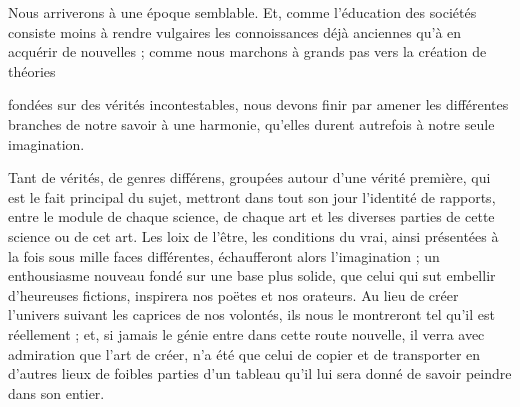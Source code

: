 \documentclass[11pt,a4paper]{article}
\begin{document}
Nous arriverons à une époque semblable. Et, comme l'éducation des sociétés
consiste moins à rendre vulgaires les connoissances déjà anciennes qu'à en
acquérir de nouvelles ; comme nous marchons à grands pas vers la création de
théories


fondées sur des vérités incontestables, nous devons finir par amener les
différentes branches de notre savoir à une harmonie, qu'elles durent autrefois
à notre seule imagination.

Tant de vérités, de genres différens,  groupées autour
d'une vérité première, qui est le fait principal du sujet, mettront dans tout
son jour l'identité de rapports, entre le module de chaque science, de chaque
art et les diverses parties de cette science ou de cet art. Les loix de l'être,
les conditions du vrai, ainsi présentées à la fois sous mille faces
différentes, échaufferont alors l'imagination ; un enthousiasme nouveau fondé
sur une base plus solide, 
que celui qui sut embellir d'heureuses fictions, inspirera nos poëtes et nos
orateurs. Au lieu de créer l'univers suivant les caprices de nos volontés, ils
nous le montreront tel qu'il est réellement ; et, si jamais le génie entre dans
cette route nouvelle, il verra avec admiration que l'art de créer, n'a été que
celui de copier et de transporter en d'autres lieux 
de foibles parties d'un tableau qu'il lui sera donné de savoir peindre dans son
entier.
\end{document}

